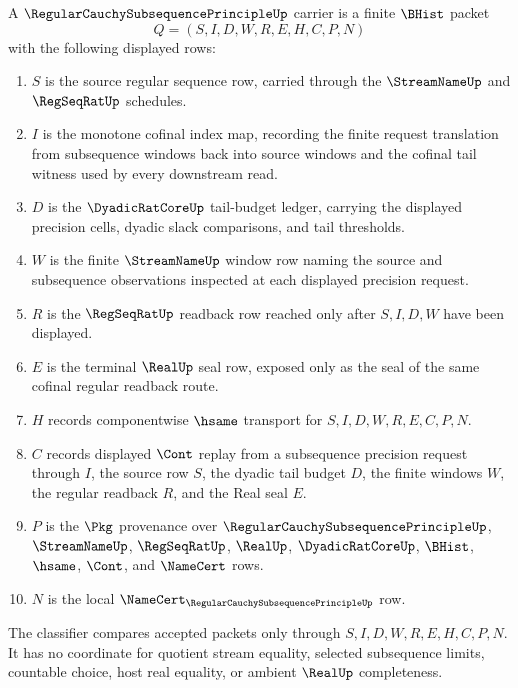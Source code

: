 \begin{definition}
\label{def:regular-cauchy-subsequence-principle-carrier}
A $\RegularCauchySubsequencePrincipleUp$ carrier is a finite $\BHist$ packet
$$
Q=(S,I,D,W,R,E,H,C,P,N)
$$
with the following displayed rows:
\begin{enumerate}
\item $S$ is the source regular sequence row, carried through the $\StreamNameUp$ and $\RegSeqRatUp$ schedules.
\item $I$ is the monotone cofinal index map, recording the finite request translation from subsequence windows back into source windows and the cofinal tail witness used by every downstream read.
\item $D$ is the $\DyadicRatCoreUp$ tail-budget ledger, carrying the displayed precision cells, dyadic slack comparisons, and tail thresholds.
\item $W$ is the finite $\StreamNameUp$ window row naming the source and subsequence observations inspected at each displayed precision request.
\item $R$ is the $\RegSeqRatUp$ readback row reached only after $S,I,D,W$ have been displayed.
\item $E$ is the terminal $\RealUp$ seal row, exposed only as the seal of the same cofinal regular readback route.
\item $H$ records componentwise $\hsame$ transport for $S,I,D,W,R,E,C,P,N$.
\item $C$ records displayed $\Cont$ replay from a subsequence precision request through $I$, the source row $S$, the dyadic tail budget $D$, the finite windows $W$, the regular readback $R$, and the Real seal $E$.
\item $P$ is the $\Pkg$ provenance over $\RegularCauchySubsequencePrincipleUp$, $\StreamNameUp$, $\RegSeqRatUp$, $\RealUp$, $\DyadicRatCoreUp$, $\BHist$, $\hsame$, $\Cont$, and $\NameCert$ rows.
\item $N$ is the local $\NameCert_{\RegularCauchySubsequencePrincipleUp}$ row.
\end{enumerate}
The classifier compares accepted packets only through $S,I,D,W,R,E,H,C,P,N$. It has no coordinate for quotient stream equality, selected subsequence limits, countable choice, host real equality, or ambient $\RealUp$ completeness.
\end{definition}


